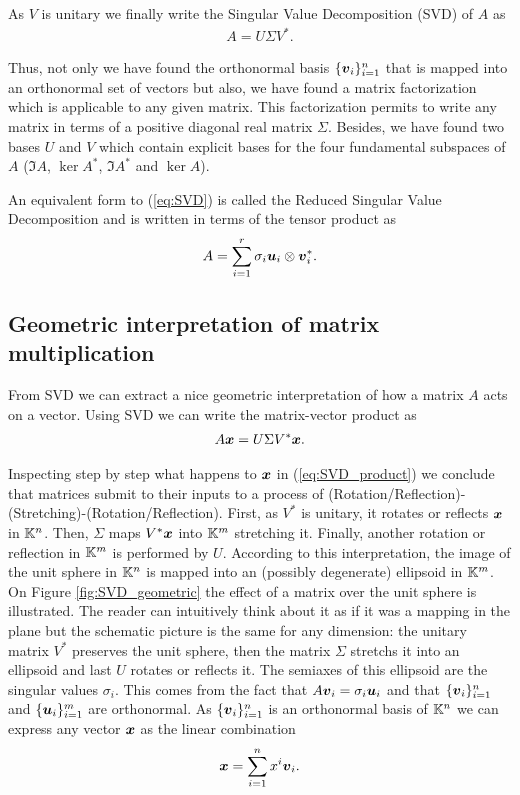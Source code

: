    As $V$ is unitary we finally write the Singular Value Decomposition (SVD) of $A$ as
   \begin{align}
   	A = U \Sigma V^*.
   	\label{eq:SVD}
   \end{align}
   
   Thus, not only we have found the orthonormal basis $\{\boldsymbol{v}_i\}_{i=1}^{n}$ that is mapped into an orthonormal set of vectors but also, 
   we have found a matrix factorization which is applicable to any given matrix. This factorization permits to write any matrix in terms of a 
   positive diagonal real matrix $\Sigma$. Besides, we have found two bases $U$ and $V$ which contain explicit bases for the four fundamental 
   subspaces of $A$ ($\Im A$, $\ker A^*$, $\Im A^*$ and $\ker A$). 
   
   An equivalent form to (\ref{eq:SVD}) is called the Reduced Singular Value Decomposition and is written in terms of the tensor product as
   \begin{align}
   	A = \sum_{i=1}^{r}\sigma_i \boldsymbol{u}_i\otimes{\boldsymbol{v}}_i^*.
   	\label{eq:SVD_spectral}
   \end{align}
   
   \subsection*{Geometric interpretation of matrix multiplication}
   From SVD we can extract a nice geometric interpretation of how a matrix $A$ acts on a vector. Using SVD we can write the matrix-vector 
   product as
   \begin{align}
   	A\boldsymbol{x} ={U} {\Sigma}{V^{*}} \boldsymbol{x}.
   	\label{eq:SVD_product}
   \end{align}
   
   Inspecting step by step what happens to $\boldsymbol{x}$ in (\ref{eq:SVD_product}) we conclude that matrices submit to their inputs to a process 
   of (Rotation/Reflection)-(Stretching)-(Rotation/Reflection). First, as $V^{*}$ is unitary, it rotates or reflects $\boldsymbol{x}$ in $\mathbb{K}^{n}$. 
   Then, $\Sigma$ maps ${V^{*}} \boldsymbol{x}$ into $\mathbb{K}^{m}$ stretching it. Finally, another rotation or reflection in $\mathbb{K}^{m}$ is performed by $U$. 
   According to this interpretation, the image of the unit sphere in $\mathbb{K}^{n}$ is mapped into an (possibly degenerate) ellipsoid in $\mathbb{K}^{m}$. On 
   Figure \ref{fig:SVD_geometric} the effect of a matrix over the unit sphere is illustrated. The reader can intuitively think about it as if 
   it was a mapping in the plane but the schematic picture is the same for any dimension: the unitary matrix $V^*$ preserves the unit sphere, 
   then the matrix $\Sigma$ stretchs it into an ellipsoid and last $U$ rotates or reflects it. The semiaxes of this ellipsoid are the 
   singular values $\sigma_i$. This comes from the fact that $A\boldsymbol{v}_i = \sigma_i \boldsymbol{u}_i$ and that $\{\boldsymbol{v}_i\}_{i=1}^{n}$ and 
   $\{\boldsymbol{u}_i\}_{i=1}^{m}$ are orthonormal. As $\{\boldsymbol{v}_i\}_{i=1}^{n}$ is an orthonormal basis of $\mathbb{K}^{n}$ we can express any vector 
   $\boldsymbol{x}$ as the linear combination
   \begin{align}
   	\boldsymbol{x} = \sum_{i=1}^{n} x^i \boldsymbol{v}_i.
   \end{align}
   
